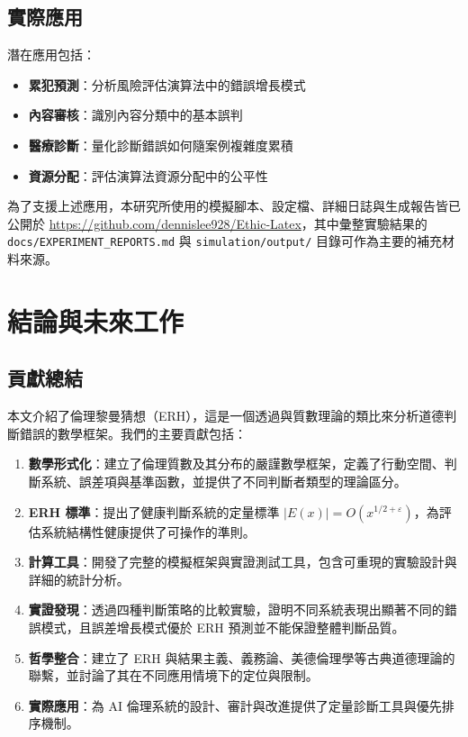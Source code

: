 \documentclass[12pt,a4paper]{article}
\theoremstyle{definition}
\theoremstyle{remark}
\begin{document}
\subsection{實際應用}

潛在應用包括：
\begin{itemize}
    \item \textbf{累犯預測}：分析風險評估演算法中的錯誤增長模式
    \item \textbf{內容審核}：識別內容分類中的基本誤判
    \item \textbf{醫療診斷}：量化診斷錯誤如何隨案例複雜度累積
    \item \textbf{資源分配}：評估演算法資源分配中的公平性
\end{itemize}

為了支援上述應用，本研究所使用的模擬腳本、設定檔、詳細日誌與生成報告皆已公開於 \url{https://github.com/dennislee928/Ethic-Latex}，其中彙整實驗結果的 \texttt{docs/EXPERIMENT\_REPORTS.md} 與 \texttt{simulation/output/} 目錄可作為主要的補充材料來源。

\section{結論與未來工作}
\label{sec:conclusion}

\subsection{貢獻總結}

本文介紹了倫理黎曼猜想（ERH），這是一個透過與質數理論的類比來分析道德判斷錯誤的數學框架。我們的主要貢獻包括：

\begin{enumerate}
    \item \textbf{數學形式化}：建立了倫理質數及其分布的嚴謹數學框架，定義了行動空間、判斷系統、誤差項與基準函數，並提供了不同判斷者類型的理論區分。
    \item \textbf{ERH 標準}：提出了健康判斷系統的定量標準 $|E(x)| = O(x^{1/2+\varepsilon})$，為評估系統結構性健康提供了可操作的準則。
    \item \textbf{計算工具}：開發了完整的模擬框架與實證測試工具，包含可重現的實驗設計與詳細的統計分析。
    \item \textbf{實證發現}：透過四種判斷策略的比較實驗，證明不同系統表現出顯著不同的錯誤模式，且誤差增長模式優於 ERH 預測並不能保證整體判斷品質。
    \item \textbf{哲學整合}：建立了 ERH 與結果主義、義務論、美德倫理學等古典道德理論的聯繫，並討論了其在不同應用情境下的定位與限制。
    \item \textbf{實際應用}：為 AI 倫理系統的設計、審計與改進提供了定量診斷工具與優先排序機制。
\end{enumerate}
\end{document}
